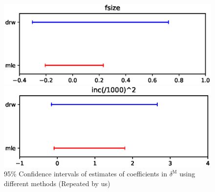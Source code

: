 \documentclass{article}
\begin{document}
\begin{figure}
\begin{minipage}{0.48\linewidth}
\end{minipage}
\begin{minipage}{0.48\linewidth}
\includegraphics[width=\linewidth]{4.eps}
\end{minipage}
\begin{minipage}{0.48\linewidth}
\includegraphics[width=\linewidth]{5.eps}
\end{minipage}
\caption{95\% Confidence intervals of estimates of coefficients in $\delta^{\mathrm{M}}$ using different methods (Repeated by us)}
\end{figure}
\end{document}
